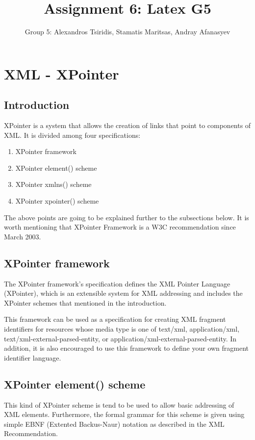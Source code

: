 \documentclass[11pt]{article}
\title{Assignment 6: Latex G5}
\author{Group 5: Alexandros Tsiridis, Stamatis Maritsas, Andray Afanasyev}
\date{}
\begin{document}
\maketitle
\tableofcontents
\listoffigures
\listoftables

\section{XML - XPointer}
\subsection{Introduction}
XPointer is a system that allows the creation of links that point to components of XML. It is divided among four specifications:
\begin{enumerate}
\item XPointer framework
\item XPointer element() scheme
\item XPointer xmlns() scheme
\item XPointer xpointer() scheme
\end{enumerate}
The above points are going to be explained further to the subsections below. It is worth mentioning that XPointer Framework is a W3C recommendation since March 2003.

\subsection{XPointer framework}

The XPointer framework's specification defines the XML Pointer Language (XPointer), which is an extensible system for XML addressing and includes the XPointer schemes that mentioned in the introduction.

This framework can be used as a specification for creating XML fragment identifiers for resources whose media type is one of text/xml, application/xml, text/xml-external-parsed-entity, or application/xml-external-parsed-entity. In addition, it is also encouraged to use this framework to define your own fragment identifier language. \cite{xpointerframework}

\subsection{XPointer element() scheme}

This kind of XPointer scheme is tend to be used to allow basic addressing of XML elements. Furthermore, the formal grammar for this scheme is given using simple EBNF (Extented Backus-Naur) notation as described in the XML Recommendation.\cite{elementscheme}
\end{document}
